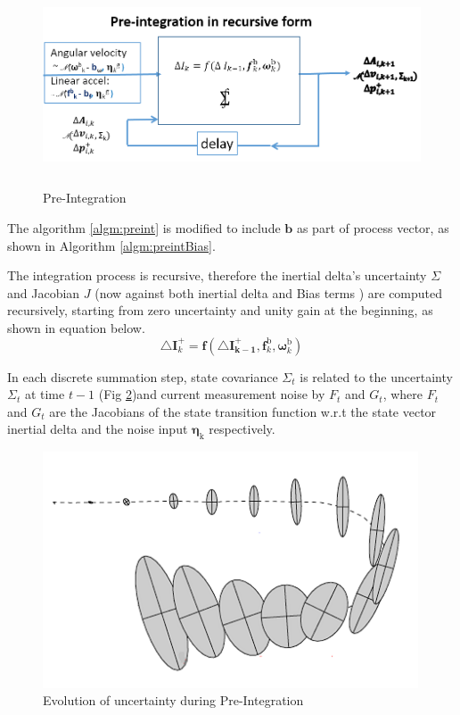 \documentclass[12pt]{article}   %
\begin{document}
\begin{figure}[h!]
	\includegraphics[height=6cm]{figures/Pre-integration_block-flow.png}
	\caption{Pre-Integration}
	\label{fig:preintBlock}
\end{figure}

The algorithm \ref{algm:preint} is modified to include $\bm{b}$ as part of process vector, as shown in Algorithm \ref{algm:preintBias}. 

The integration process is recursive, therefore the inertial delta's uncertainty $\Sigma$ and Jacobian $J$ (now against both inertial delta and Bias terms ) are computed recursively, starting from zero uncertainty and unity gain at the beginning, as shown in equation below.
\begin{equation}
\triangle {\bm{I}}^+_k = \bm{f}( \bm{\triangle I^+_{k-1}}, \bm{f}^{\mathrm{b}}_{k}, \bm{\omega}^{\mathrm{b}}_{k})
\end{equation}

In each discrete summation step, state covariance $\Sigma_t$ is related to the uncertainty $\Sigma_t$ at time $t-1$ (Fig \ref{fig:preintUncertainty})and current measurement noise by $F_t$ and $G_t$, where $F_t$ and $G_t$ are the Jacobians of the state transition function w.r.t the state vector inertial delta and the noise input $\mathrm{\bm{\eta}_k}$ respectively.
\begin{figure}[h!]
	\includegraphics[height=7cm]{figures/Inertial-delta_covariance_evolution.png}
	\caption{Evolution of uncertainty during Pre-Integration}
	\label{fig:preintUncertainty}
\end{figure}
\end{document}

